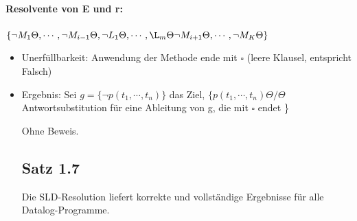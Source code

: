 \documentclass[12pt, a4paper]{article}
\begin{document}
\paragraph{Resolvente von E und r:} $\{ \lnot M_1\Theta, \cdots, \lnot M_{i-1}\Theta, \lnot L_1 \Theta, \cdots, \L_m \Theta \lnot M_{i + 1} \Theta, \cdots, \lnot M_K\Theta \}$
\begin{itemize}
\item Unerfüllbarkeit: Anwendung der Methode ende mit $\square$ (leere Klausel, entspricht Falsch)
\item Ergebnis: Sei $g = \{ \lnot p(t_1, \cdots, t_n) \}$ das Ziel, $\{ p(t_1, \cdots, t_n)\Theta / \Theta$ Antwortsubstitution für eine Ableitung von g, die mit $\square$ endet \}



Ohne Beweis.

\subsection*{Satz 1.7}
Die SLD-Resolution liefert korrekte und vollständige Ergebnisse für alle Datalog-Programme.


\end{itemize}
\end{document}
